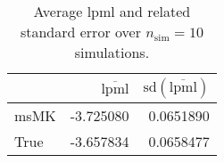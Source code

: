 \begin{table}[H]

\caption{Average lpml and related standard error over $n_{\text{sim}} = 10$ simulations.}
\centering
\begin{tabular}[t]{lrr}
\toprule
  & $\overbar{\text{lpml}}$ & $\text{sd}(\overbar{\text{lpml}})$\\
\midrule
msMK & -3.725080 & 0.0651890\\
True & -3.657834 & 0.0658477\\
\bottomrule
\end{tabular}
\end{table}